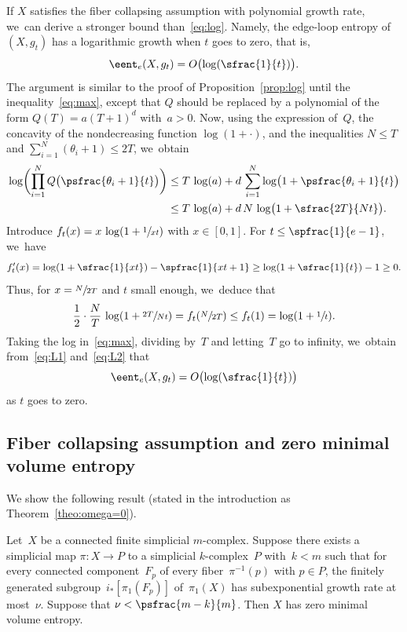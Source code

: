 \begin{remark}
If $X$ satisfies the fiber collapsing assumption with polynomial growth rate, we~can derive a stronger bound than~\eqref{eq:log}.
Namely, the edge-loop entropy of~$(X,g_t)$ has a logarithmic growth when $t$ goes to zero, that is,
\[
\eent_e(X,g_t) = O \bigl(\log(\sfrac{1}{t}) \bigr).
\]
The argument is similar to the proof of Proposition~\ref{prop:log} until the inequality~\eqref{eq:max}, except that $Q$ should be replaced by a polynomial of the form $Q(T)=a(T+1)^d$ with~$a>0$.
Now, using the expression of~$Q$, the concavity of the nondecreasing function $\log(1+\cdot)$, and the inequalities $N \leq T$ and $\sum_{i=1}^N (\theta_i+1) \leq 2T$, we~obtain
\begin{equation}\label{eq:L1}
\begin{aligned}
\log \biggl(\prod_{i=1}^N Q \bigl(\psfrac{\theta_i+1}{t} \bigr) \biggr) & \leq T \, \log(a) + d \, \sum_{i=1}^N \log \bigl( 1+\psfrac{\theta_i+1}{t} \bigr) \\
 & \leq T \, \log(a) + d \, N \, \log \bigl( 1+\sfrac{2T}{Nt} \bigr).
\end{aligned}
\end{equation}
Introduce $f_t(x) = x \, \log(1+\sfrac{1}{xt})$ with $x \in [0,1]$.
For $t \leq \spfrac{1}{e-1}$, we~have
\[
f'_t(x) = \log(1+\sfrac{1}{xt}) - \spfrac{1}{xt+1} \geq \log(1+\sfrac{1}{t}) -1 \geq 0.
\]
Thus, for $x=\sfrac{N}{2T}$ and $t$ small enough, we~deduce that
\begin{equation} \label{eq:L2}
\frac{1}{2} \cdot \frac{N}{T} \, \log(1+\sfrac{2T}{Nt}) = f_t(\sfrac{N}{2T}) \leq f_t(1) = \log(1+\sfrac{1}{t}).
\end{equation}
Taking the log in~\eqref{eq:max}, dividing by~$T$ and letting~$T$ go to infinity, we~obtain from~\eqref{eq:L1} and~\eqref{eq:L2} that
\[
\eent_e(X,g_t) = O \bigl(\log(\sfrac{1}{t}) \bigr)
\]
as $t$ goes to zero.
\end{remark}

\subsection{Fiber collapsing assumption and zero minimal volume entropy}

We show the following result (stated in the introduction as Theorem~\ref{theo:omega=0}).

\begin{theorem} \label{theo:A}
Let~$X$ be a connected finite simplicial $m$\nobreakdash-complex.
Suppose there exists a simplicial map $\pi:X \to P$ to a simplicial $k$-complex~$P$ with~$k<m$ such that for every connected component~$F_p$ of every fiber~$\pi^{-1}(p)$ with $p \in P$, the finitely generated subgroup~$i_*[\pi_1(F_p)]$ of~$\pi_1(X)$ has subexponential growth rate at most~$\nu$.
Suppose that $\nu < \psfrac{m-k}{m}$.
Then $X$ has zero minimal volume entropy.
\end{theorem}

